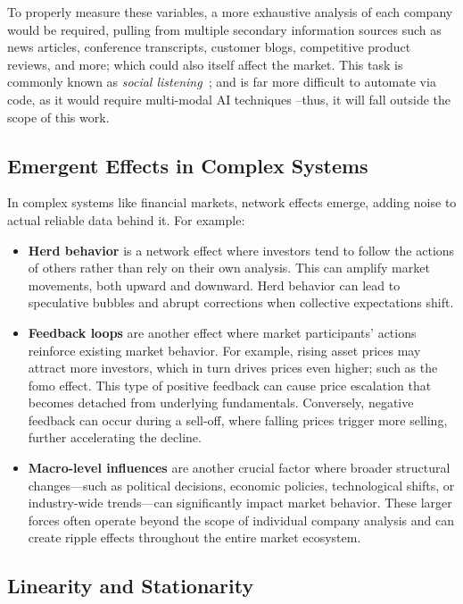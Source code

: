 \documentclass[11pt,english,a4paper,hidelinks]{book}
\begin{document}
\noindent To properly measure these variables, a more exhaustive analysis of each company would be required, pulling from multiple secondary information sources such as news articles, conference transcripts, customer blogs, competitive product reviews, and more; which could also itself affect the market. This task is commonly known as \textit{social listening}~\cite{WANG2022110598}; and is far more difficult to automate via code, as it would require multi-modal AI techniques --thus, it will fall outside the scope of this work.

\subsection{Emergent Effects in Complex Systems}

\noindent In complex systems like financial markets, network effects emerge, adding noise to actual reliable data behind it. For example:

\begin{itemize}
    \item \textbf{Herd behavior} is a network effect where investors tend to follow the actions of others rather than rely on their own analysis. This can amplify market movements, both upward and downward. Herd behavior can lead to speculative bubbles and abrupt corrections when collective expectations shift.
    \item \textbf{Feedback loops} are another effect where market participants' actions reinforce existing market behavior. For example, rising asset prices may attract more investors, which in turn drives prices even higher; such as the \gls{fomo} effect. This type of positive feedback can cause price escalation that becomes detached from underlying fundamentals. Conversely, negative feedback can occur during a sell-off, where falling prices trigger more selling, further accelerating the decline.
    \item \textbf{Macro-level influences} are another crucial factor where broader structural changes—such as political decisions, economic policies, technological shifts, or industry-wide trends—can significantly impact market behavior. These larger forces often operate beyond the scope of individual company analysis and can create ripple effects throughout the entire market ecosystem.
\end{itemize}

\subsection{Linearity and Stationarity}
\end{document}
